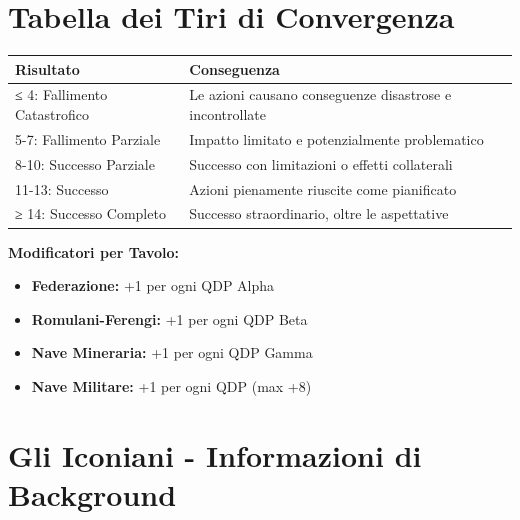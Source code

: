\documentclass[11pt,a4paper]{article}
\begin{document}
\section{Tabella dei Tiri di Convergenza}

\begin{tcolorbox}[colback=masterlightpurple!10, colframe=masterpurple]
\begin{tabularx}{\textwidth}{|l|X|}
\hline
\rowcolor{masterlightpurple!30} \textbf{Risultato} & \textbf{Conseguenza} \\
\hline
≤ 4: Fallimento Catastrofico & Le azioni causano conseguenze disastrose e incontrollate \\
\hline
5-7: Fallimento Parziale & Impatto limitato e potenzialmente problematico \\
\hline
8-10: Successo Parziale & Successo con limitazioni o effetti collaterali \\
\hline
11-13: Successo & Azioni pienamente riuscite come pianificato \\
\hline
≥ 14: Successo Completo & Successo straordinario, oltre le aspettative \\
\hline
\end{tabularx}

\textbf{Modificatori per Tavolo:}
\begin{itemize}[leftmargin=*]
\item \textbf{Federazione:} +1 per ogni QDP Alpha
\item \textbf{Romulani-Ferengi:} +1 per ogni QDP Beta
\item \textbf{Nave Mineraria:} +1 per ogni QDP Gamma
\item \textbf{Nave Militare:} +1 per ogni QDP (max +8)
\end{itemize}
\end{tcolorbox}

\section{Gli Iconiani - Informazioni di Background}
\end{document}
